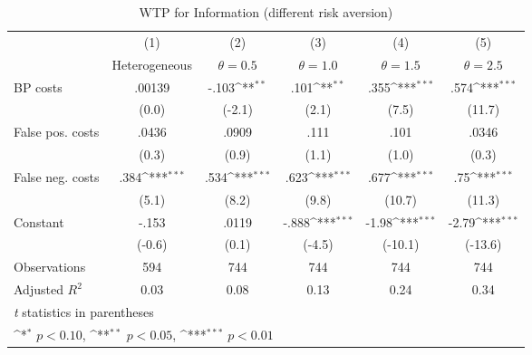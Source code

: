 \begin{table}[htbp]\centering
\def\sym#1{\ifmmode^{#1}\else\(^{#1}\)\fi}
\caption{WTP for Information (different risk aversion)}
\begin{tabular}{l*{5}{c}}
\hline\hline
                &\multicolumn{1}{c}{(1)}&\multicolumn{1}{c}{(2)}&\multicolumn{1}{c}{(3)}&\multicolumn{1}{c}{(4)}&\multicolumn{1}{c}{(5)}\\
                &\multicolumn{1}{c}{Heterogeneous}&\multicolumn{1}{c}{$\theta=0.5$}&\multicolumn{1}{c}{$\theta=1.0$}&\multicolumn{1}{c}{$\theta=1.5$}&\multicolumn{1}{c}{$\theta=2.5$}\\
\hline
BP costs        &   .00139         &    -.103\sym{**} &     .101\sym{**} &     .355\sym{***}&     .574\sym{***}\\
                &    (0.0)         &   (-2.1)         &    (2.1)         &    (7.5)         &   (11.7)         \\
False pos. costs&    .0436         &    .0909         &     .111         &     .101         &    .0346         \\
                &    (0.3)         &    (0.9)         &    (1.1)         &    (1.0)         &    (0.3)         \\
False neg. costs&     .384\sym{***}&     .534\sym{***}&     .623\sym{***}&     .677\sym{***}&      .75\sym{***}\\
                &    (5.1)         &    (8.2)         &    (9.8)         &   (10.7)         &   (11.3)         \\
Constant        &    -.153         &    .0119         &    -.888\sym{***}&    -1.98\sym{***}&    -2.79\sym{***}\\
                &   (-0.6)         &    (0.1)         &   (-4.5)         &  (-10.1)         &  (-13.6)         \\
\hline
Observations    &      594         &      744         &      744         &      744         &      744         \\
Adjusted \(R^{2}\)&     0.03         &     0.08         &     0.13         &     0.24         &     0.34         \\
\hline\hline
\multicolumn{6}{l}{\footnotesize \textit{t} statistics in parentheses}\\
\multicolumn{6}{l}{\footnotesize \sym{*} \(p<0.10\), \sym{**} \(p<0.05\), \sym{***} \(p<0.01\)}\\
\end{tabular}
\end{table}
